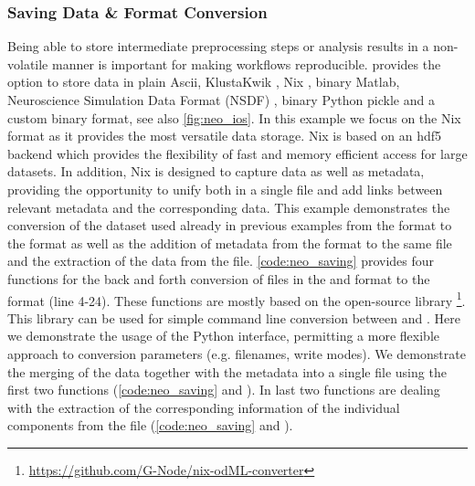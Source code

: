 \subsubsection{Saving Data \& Format Conversion}
Being able to store intermediate preprocessing steps or analysis results in a non-volatile manner is important for making workflows reproducible.  provides the option to store data in plain Ascii, KlustaKwik \citep{Hazan_2006}, Nix \citep{Stoewer_2014}, binary Matlab, Neuroscience Simulation Data Format (NSDF) \citep{Ray_2016}, binary Python pickle and a custom binary format, see also \cref{fig:neo_ios}. In this example we focus on the Nix format as it provides the most versatile data storage. Nix is based on an hdf5 \citep{TheHDFGroup_1997} backend which provides the flexibility of fast and memory efficient access for large datasets. In addition, Nix is designed to capture data as well as metadata, providing the opportunity to unify both in a single file and add links between relevant metadata and the corresponding data. 
This example demonstrates the conversion of the dataset used already in previous examples from the  format to the  format as well as the addition of metadata from the  format to the same file and the extraction of the data from the  file.
\cref{code:neo_saving} provides four functions for the back and forth conversion of files in the  and  format to the  format (line 4-24). These functions are mostly based on the open-source  library \footnote{\url{https://github.com/G-Node/nix-odML-converter}}. This library can be used for simple command line conversion between  and . Here we demonstrate the usage of the Python interface, permitting a more flexible approach to conversion parameters (e.g. filenames, write modes).
We demonstrate the merging of the data together with the metadata into a single  file using the first two functions (\cref{code:neo_saving}  and ). In last two functions are dealing with the extraction of the corresponding information of the individual components from the  file (\cref{code:neo_saving}  and ).

